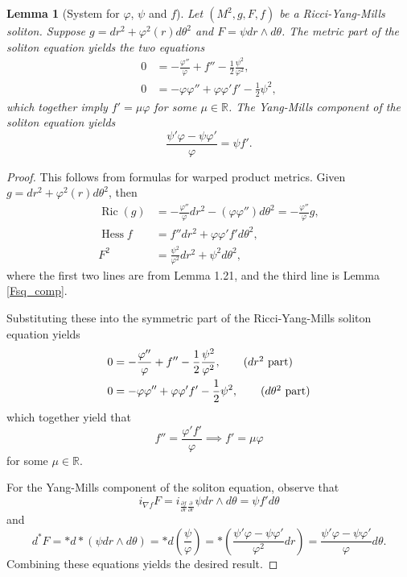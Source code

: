 \documentclass[12pt, a4paper, reqno, oneside]{amsart}
\newcommand{\R}{\mathbb{R}}
\renewcommand{\phi}{\varphi}
\newcommand{\grad}{\nabla}
\DeclareMathOperator{\Hess}{Hess}
\DeclareMathOperator{\Ric}{Ric}
\numberwithin{equation}{section}
\theoremstyle{plain}
\newtheorem{lemma}[theorem]{Lemma}
\theoremstyle{definition}
\theoremstyle{plain}
\begin{document}
\begin{lemma}[System for $\phi$, $\psi$ and $f$]\label{YMSurfSolMetricEq}
  Let $(M^{2}, g, F, f)$ be a Ricci-Yang-Mills soliton. Suppose $g=dr^{2}+\phi^{2}(r)d\theta^{2}$ and $F=\psi dr\wedge d\theta$. The metric part of the soliton equation yields the two equations
  \begin{align*}
    0 &= -\frac{\phi''}{\phi}+f''-\frac{1}{2}\frac{\psi^{2}}{\phi^{2}},    \\
    0 &= -\phi\phi''+\phi\phi'f'-\frac{1}{2}\psi^{2},
  \end{align*}
  which together imply $f'=\mu\phi$ for some $\mu\in\R$. The Yang-Mills component of the soliton equation yields
  \[
    \frac{\psi'\phi-\psi\phi'}{\phi} = \psi f'.
  \]
\end{lemma}
\begin{proof}
  This follows from formulas for warped product metrics. Given $g=dr^{2}+\phi^{2}(r)d\theta^{2}$, then
  \begin{align*}
    \Ric(g) &= -\frac{\phi''}{\phi} dr^{2} -(\phi\phi'')d\theta^{2}=-\frac{\phi''}{\phi}g,\\
    \Hess f &= f''dr^{2}+\phi\phi'f'd\theta^{2},\\
    F^2 &= \frac{\psi^{2}}{\phi^{2}}dr^{2}+\psi^{2}d\theta^{2},
  \end{align*}
  where the first two lines are from \cite{chow_etalRicciFlowVol1_2007} Lemma 1.21, and the third line is Lemma \ref{Fsq_comp}.

  Substituting these into the symmetric part of the Ricci-Yang-Mills soliton equation yields
  \begin{align*}
    0 &= -\frac{\phi''}{\phi}+f''-\frac{1}{2}\frac{\psi^{2}}{\phi^{2}},    \tag*{($dr^{2}$ part)}\\
    0 &= -\phi\phi''+\phi\phi'f'-\frac{1}{2}\psi^{2},    \tag*{($d\theta^{2}$ part)}
  \end{align*}
  which together yield that
  \[
    f'' = \frac{\phi' f'}{\phi} \implies f' = \mu\phi 
  \]
  for some $\mu\in\R$.

  For the Yang-Mills component of the soliton equation, observe that
  \[
    i_{\grad f}F = i_{\frac{\partial f}{\partial r}\frac{\partial}{\partial r}}\psi dr\wedge d\theta = \psi f' d\theta
  \]
  and 
  \[
    d^{*}F = *d*(\psi dr\wedge d\theta) = *d\left(\frac{\psi}{\phi}\right) = *\left(\frac{\psi'\phi-\psi\phi'}{\phi^{2}} dr\right) = \frac{\psi'\phi-\psi\phi'}{\phi} d\theta.
  \]
  Combining these equations yields the desired result.
\end{proof}
\end{document}
